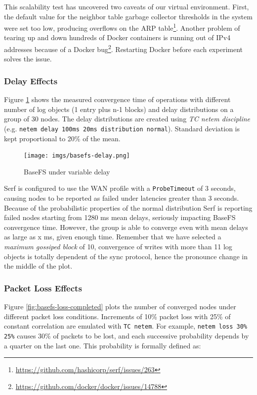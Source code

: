 \documentclass{sig-alternate}
\begin{document}
This scalability test has uncovered two caveats of our virtual environment. First, the default value for the neighbor table garbage collector thresholds in the system were set too low, producing overflows on the ARP table\footnote{\url{https://github.com/hashicorp/serf/issues/263}}. Another problem of tearing up and down hundreds of Docker containers is running out of IPv4 addresses because of a Docker bug\footnote{\url{https://github.com/docker/docker/issues/14788}}. Restarting Docker before each experiment solves the issue.


\subsubsection{Delay Effects}

Figure \ref{fig:basefs-delay} shows the measured convergence time of operations with different number of log objects (1 entry plus n-1 blocks) and delay distributions on a group of 30 nodes. The delay distributions are created using \textit{TC netem discipline} (e.g. \texttt{netem delay 100ms 20ms distribution normal}). Standard deviation is kept proportional to 20\% of the mean.

\begin{figure}
\centering
\texttt{[image: imgs/basefs-delay.png]}
\caption{BaseFS under variable delay}
\label{fig:basefs-delay}
\end{figure}

Serf is configured to use the WAN profile with a \texttt{ProbeTimeout} of 3 seconds, causing nodes to be reported as failed under latencies greater than 3 seconds. Because of the probabilistic properties of the normal distribution Serf is reporting failed nodes starting from 1280 ms mean delays, seriously impacting BaseFS convergence time. However, the group is able to converge even with mean delays as large as x ms, given enough time. Remember that we have selected a \textit{maximum gossiped block} of 10, convergence of writes with more than 11 log objects is totally dependent of the sync protocol, hence the pronounce change in the middle of the plot.


\subsubsection{Packet Loss Effects}

Figure \ref{fig:basefs-loss-completed} plots the number of converged nodes under different packet loss conditions. Increments of 10\% packet loss with 25\% of constant correlation are emulated with \texttt{TC netem}. For example, \texttt{netem loss 30\% 25\%} causes 30\% of packets to be lost, and each successive probability depends by a quarter on the last one. This probability is formally defined as:
\end{document}

